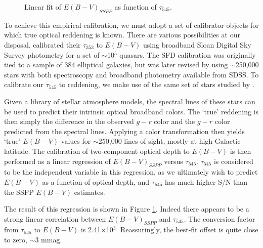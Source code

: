 \documentclass{emulateapj}
\begin{document}
\begin{figure}
\begin{center}
\caption{\label{fig:calib} Linear fit of $E(B-V)_{SSPP}$ as function of
$\tau_{545}$.}
\end{center}
\end{figure}

To achieve this empirical calibration, we must adopt a set of calibrator
objects for which true optical reddening is known. There are various 
possibilities at our disposal. \cite{planckdust} calibrated their $\tau_{353}$ 
to $E(B-V)$ using broadband Sloan Digital Sky Survey \citep[SDSS;][]{sdss} 
photometry for a set of $\sim$10$^5$ quasars. The SFD calibration was 
originally tied to a sample of 384 elliptical galaxies, but was later revised 
by \cite{schlafly11} using $\sim$250,000 stars with both spectroscopy and 
broadband photometry available from SDSS. To calibrate our $\tau_{545}$ to 
reddening, we make use of the same set of stars studied by \cite{schlafly11}.



Given a library of stellar atmosphere models, the spectral lines of these stars
can be used to predict their intrinsic optical broadband colors. The `true' 
reddening is then simply the difference in the observed $g-r$ color and the 
$g-r$ color predicted from the spectral lines. Applying a color transformation 
then yields `true' $E(B-V)$ values for $\sim$250,000 lines of sight, mostly at 
high Galactic latitude. The calibration of two-component optical depth to 
$E(B-V)$ is then performed as a linear regression of $E(B-V)_{SSPP}$ versus 
$\tau_{545}$. $\tau_{545}$ is considered to be the independent variable in this
regression, as we ultimately wish to predict $E(B-V)$ as a function of optical 
depth, and $\tau_{545}$ has much higher S/N than the SSPP $E(B-V)$ estimates. 

The result of this regression is shown in Figure \ref{fig:calib}. Indeed there 
appears to be a strong linear correlation between $E(B-V)_{SSPP}$ 
and $\tau_{545}$. The conversion factor from $\tau_{545}$ to $E(B-V)$ is 
2.41$\times$10$^{3}$. Reassuringly, the best-fit offset is quite close to 
zero, $\sim$3 mmag.
\end{document}
